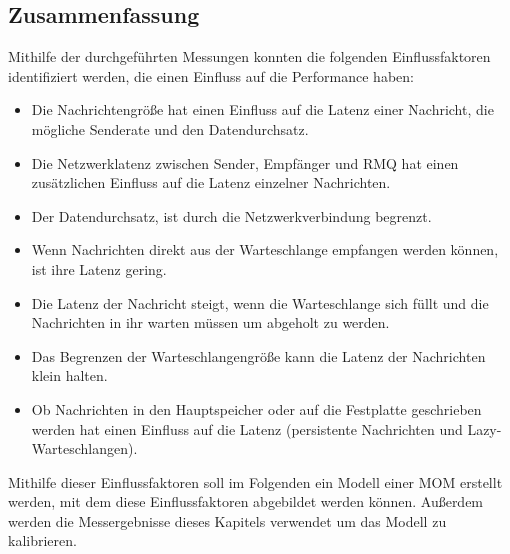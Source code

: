 \subsection{Zusammenfassung}
\label{sec:rmqZusammenfassung}
Mithilfe der durchgeführten Messungen konnten die folgenden Einflussfaktoren identifiziert werden, die einen Einfluss auf die Performance haben:
\begin{itemize}
    \item Die Nachrichtengröße hat einen Einfluss auf die Latenz einer Nachricht, die mögliche Senderate und den Datendurchsatz.
    \item Die Netzwerklatenz zwischen Sender, Empfänger und RMQ hat einen zusätzlichen Einfluss auf die Latenz einzelner Nachrichten.
    \item Der Datendurchsatz, ist durch die Netzwerkverbindung begrenzt.
    \item Wenn Nachrichten direkt aus der Warteschlange empfangen werden können, ist ihre Latenz gering.
    \item Die Latenz der Nachricht steigt, wenn die Warteschlange sich füllt und die Nachrichten in ihr warten müssen um abgeholt zu werden.
    \item Das Begrenzen der Warteschlangengröße kann die Latenz der Nachrichten klein halten.
    \item Ob Nachrichten in den Hauptspeicher oder auf die Festplatte geschrieben werden hat einen Einfluss auf die Latenz (persistente Nachrichten und Lazy-Warteschlan\-gen).
\end{itemize}
Mithilfe dieser Einflussfaktoren soll im Folgenden ein Modell einer MOM erstellt werden, mit dem diese Einflussfaktoren abgebildet werden können. Außerdem werden die Messergebnisse dieses Kapitels verwendet um das Modell zu kalibrieren.






